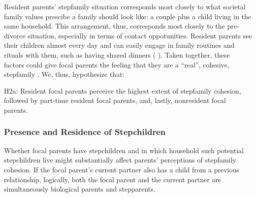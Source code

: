 \documentclass[\pandocDocMode,longtable,floatsintext]{apa6}
\begin{document}
Resident parents' stepfamily situation corresponds most closely to what
societal family values prescibe a family should look like: a couple plus
a child living in the same household. This arrangement, thus,
corresponds most closely to the pre-divorce situation, especially in
terms of contact oppotunities. Resident parents see their children
almost every day and can easily engage in family routines and rituals
with them, such as having shared dinners (\autocite{bakker2015family}
\autocite{waller2014residential}). Taken together, these factors could
give focal parents the feeling that they are a ``real'', cohesive,
stepfamily \autocite{weaver2010caught}. We, thus, hypothesize that:

H2a: Resident focal parents perceive the highest extent of stepfamily
cohesion, followed by part-time resident focal parents, and, lastly,
nonresident focal parents.

\hypertarget{presence-and-residence-of-stepchildren}{%
\subsubsection{Presence and Residence of
Stepchildren}\label{presence-and-residence-of-stepchildren}}

Whether focal parents have stepchildren and in which household such
potential stepchildren live might substantially affect parents'
perceptions of stepfamily cohesion. If the focal parent's current
partner also has a child from a previous relationship, logically, both
the focal parent and the current partner are simultaneously biological
parents and stepparents.
\end{document}
